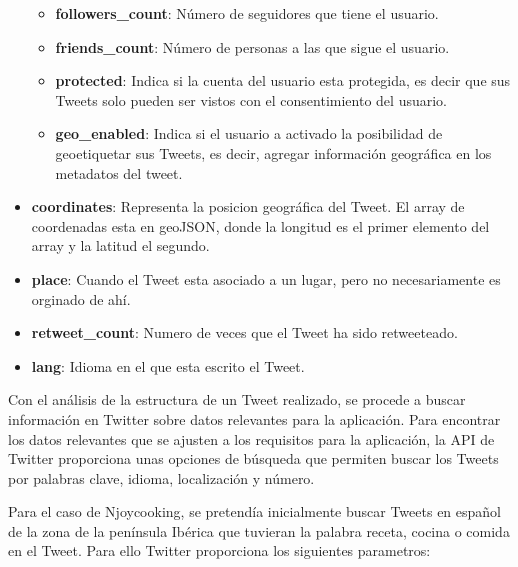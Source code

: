 \begin{itemize}
\begin{itemize}
\item \textbf{followers\_count}: Número de seguidores que tiene el usuario.

\item \textbf{friends\_count}: Número de personas a las que sigue el usuario.

\item \textbf{protected}: Indica si la cuenta del usuario esta protegida, es decir que sus Tweets solo pueden ser vistos con el consentimiento del usuario.

\item \textbf{geo\_enabled}: Indica si el usuario a activado la posibilidad de geoetiquetar sus Tweets, es decir, agregar información geográfica en los metadatos del tweet.


\end{itemize}

\item \textbf{coordinates}: Representa la posicion geográfica del Tweet. El array de coordenadas esta en geoJSON, donde la longitud es el primer elemento del array y la latitud el segundo.

\item \textbf{place}: Cuando el Tweet esta asociado a un lugar, pero no necesariamente es orginado de ahí.

\item \textbf{retweet\_count}: Numero de veces que el Tweet ha sido retweeteado.

\item \textbf{lang}: Idioma en el que esta escrito el Tweet. 

\end{itemize}

\vspace{5 mm}

Con el análisis de la estructura de un Tweet realizado, se procede a buscar información en Twitter sobre datos relevantes para la aplicación. Para encontrar los datos relevantes que se ajusten a los requisitos para la aplicación, la API de Twitter proporciona unas opciones de búsqueda que permiten buscar los Tweets por palabras clave, idioma, localización y número.

\vspace{5 mm}

Para el caso de Njoycooking, se pretendía inicialmente buscar Tweets en español de la zona de la península Ibérica que tuvieran la palabra receta, cocina o comida en el Tweet. Para ello Twitter proporciona los siguientes parametros:

